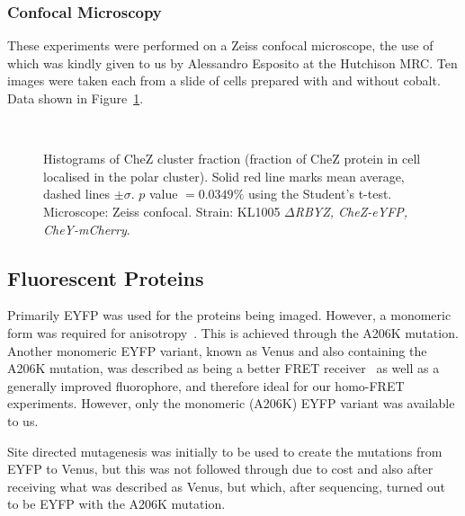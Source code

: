 \documentclass[../main.tex]{subfiles}
\begin{document}
\subsubsection{Confocal Microscopy}
\label{sec:results:cs:confocal}
These experiments were performed on a Zeiss confocal microscope, the use of which was kindly given to us by Alessandro Esposito at the Hutchison MRC. Ten images were taken each from a slide of cells prepared with and without cobalt. Data shown in Figure~\ref{fig:results:zeiss}.

\begin{figure}
\begin{center}
\\
\caption[Image processing results on Zeiss confocal microscope]{Histograms of CheZ cluster fraction (fraction of CheZ protein in cell localised in the polar cluster). Solid red line marks mean average, dashed lines \(\pm\sigma\). \(p\) value \(=0.0349\%\) using the Student's t-test. Microscope: Zeiss confocal. Strain: KL1005 \textsl{\(\Delta\)RBYZ, CheZ-eYFP, CheY-mCherry}.}
\label{fig:results:zeiss}
\end{center}
\end{figure}

\cleardoublepage

\subsection{Fluorescent Proteins}

Primarily EYFP was used for the proteins being imaged. However, a monomeric form was required for anisotropy~\citep{vaknin07}. This is achieved through the A206K mutation. Another monomeric EYFP variant, known as Venus and also containing the A206K mutation, was described as being a better FRET receiver~\citep{nagai02} as well as a generally improved fluorophore, and therefore ideal for our homo-FRET experiments. However, only the monomeric (A206K) EYFP variant was available to us.

Site directed mutagenesis was initially to be used to create the mutations from EYFP to Venus, but this was not followed through due to cost and also after receiving what was described as Venus, but which, after sequencing, turned out to be EYFP with the A206K mutation.
\end{document}
